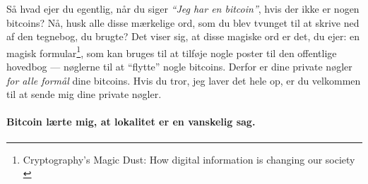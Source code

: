 Så hvad ejer du egentlig, når du siger \textit{\enquote{Jeg har en bitcoin}}, hvis der ikke er nogen bitcoins? Nå, husk alle disse mærkelige ord, som du blev tvunget til at skrive ned af den tegnebog, du brugte? Det viser sig, at disse magiske ord er det, du ejer: en magisk formular\footnote{Cryptography's Magic Dust: How digital information is changing our society \cite{gigi:magic-spell}}, som kan bruges til at tilføje nogle poster til den offentlige hovedbog --- nøglerne til at \enquote{flytte} nogle bitcoins. Derfor er dine private nøgler \textit{for alle formål} dine bitcoins. Hvis du tror, jeg laver det hele op, er du velkommen til at sende mig dine private nøgler.

\paragraph{Bitcoin lærte mig, at lokalitet er en vanskelig sag.}

%
%
%
%
%
%
%
